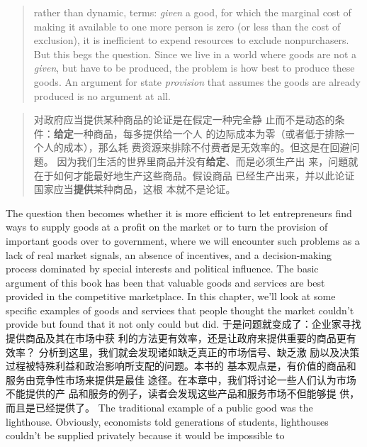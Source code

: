 \begin{paracol}{2}
\begin{quote}
rather than dynamic, terms: \textit{given} a good, for which the marginal
cost of making it available to one more person is zero (or less than
the cost of exclusion), it is inefficient to expend resources to exclude nonpurchasers. But this begs the question. Since we live in a world where goods are not a \textit{given}, but have to be produced, the
problem is how best to produce these goods. An argument for
state \textit{provision} that assumes the goods are already produced is no
argument at all.
\end{quote}
\switchcolumn
\begin{quote}
对政府应当提供某种商品的论证是在假定一种完全静
止而不是动态的条件：\textbf{给定}一种商品，每多提供给一个人
的边际成本为零（或者低于排除一个人的成本），那么耗
费资源来排除不付费者是无效率的。但这是在回避问题。
因为我们生活的世界里商品并没有\textbf{给定}、而是必须生产出
来，问題就在于如何才能最好地生产这些商品。假设商品
已经生产出来，并以此论证国家应当\textbf{提供}某种商品，这根
本就不是论证。
\end{quote}
\switchcolumn*
The question then becomes whether it is more efficient to let
entrepreneurs find ways to supply goods at a profit on the market or to turn the provision of important goods over to government, where we will encounter such problems as a lack of real
market signals, an absence of incentives, and a decision-making
process dominated by special interests and political influence.
The basic argument of this book has been that valuable goods
and services are best provided in the competitive marketplace.
In this chapter, we'll look at some specific examples of goods
and services that people thought the market couldn't provide
but found that it not only could but did.
\switchcolumn
于是问题就变成了：企业家寻找提供商品及其在市场中获
利的方法更有效率，还是让政府来提供重要的商品更有效率？
分析到这里，我们就会发现诸如缺乏真正的市场信号、缺乏激
励以及决策过程被特殊利益和政治影响所支配的问题。本书的
基本观点是，有价值的商品和服务由竞争性市场来提供是最佳
途径。在本章中，我们将讨论一些人们认为市场不能提供的产
品和服务的例子，读者会发现这些产品和服务市场不但能够提
供，而且是已经提供了。
The traditional example of a public good was the lighthouse.
Obviously, economists told generations of students, lighthouses
couldn't be supplied privately because it would be impossible to

\end{paracol}
